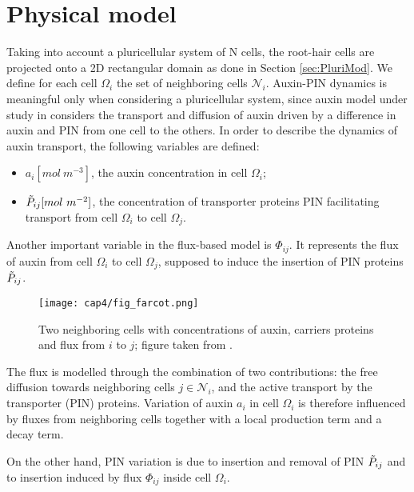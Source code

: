 \section{Physical model}
Taking into account a pluricellular system of N cells, the root-hair cells are projected onto a 2D rectangular domain as done in Section \ref{sec:PluriMod}. We define for each cell $\Omega_i$ the set of neighboring cells $\mathcal{N}_i$. Auxin-PIN dynamics is meaningful only when considering a pluricellular system, since auxin model under study in \cite{plant:Farcot} considers the transport and diffusion of auxin driven by a difference in auxin and PIN from one cell to the others. In order to describe the dynamics of auxin transport, the following variables are defined:
\begin{itemize}
  \item $a_i [mol \ m^{-3}]$, the auxin concentration in cell $\Omega_i$;
  \item $\Tilde{P}_{ij} [mol \ m^{-2}]$, the concentration of transporter proteins PIN facilitating transport from cell $\Omega_i$ to cell $\Omega_j$.
\end{itemize}
Another important variable in the flux-based model is $\Phi_{ij}$. It represents the flux of auxin from cell $\Omega_i$ to cell $\Omega_j$, supposed to induce the insertion of PIN proteins $\Tilde{P}_{ij}$.
\begin{figure}
  \centering
  \texttt{[image: cap4/fig\_farcot.png]}
  \caption{Two neighboring cells with concentrations of auxin, carriers proteins and flux from $i$ to $j$; figure taken from \cite{plant:Farcot}.}
  \label{fig:farcot}
\end{figure}
The flux is modelled through the combination of two contributions: the free diffusion towards neighboring cells $j \in \mathcal{N}_i$, and the active transport by the transporter (PIN) proteins. Variation of auxin $a_i$ in cell $\Omega_i$ is therefore influenced by fluxes from neighboring cells together with a local production term and a decay term.

On the other hand, PIN variation is due to insertion and removal of PIN $\Tilde{P}_{ij}$ and to insertion induced by flux $\Phi_{ij}$ inside cell $\Omega_i$.

